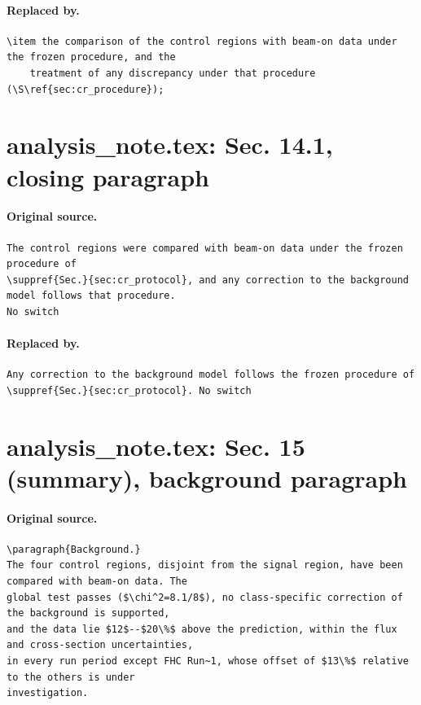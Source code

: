\documentclass[11pt,a4paper]{article}
\newcommand{\suppref}[2]{#1~\ref{S-#2} of the technical supplement}
\begin{document}
\paragraph{Replaced by.}
\begin{lstlisting}[language={[LaTeX]TeX},basicstyle=\ttfamily\footnotesize,columns=fullflexible]
  \item the comparison of the control regions with beam-on data under the frozen procedure, and the
    treatment of any discrepancy under that procedure (\S\ref{sec:cr_procedure});
\end{lstlisting}

\section{analysis\_note.tex: Sec. 14.1, closing paragraph}
\paragraph{Original source.}
\begin{lstlisting}[language={[LaTeX]TeX},basicstyle=\ttfamily\footnotesize,columns=fullflexible]
The control regions were compared with beam-on data under the frozen procedure of
\suppref{Sec.}{sec:cr_protocol}, and any correction to the background model follows that procedure.
No switch
\end{lstlisting}
\paragraph{Replaced by.}
\begin{lstlisting}[language={[LaTeX]TeX},basicstyle=\ttfamily\footnotesize,columns=fullflexible]
Any correction to the background model follows the frozen procedure of
\suppref{Sec.}{sec:cr_protocol}. No switch
\end{lstlisting}

\section{analysis\_note.tex: Sec. 15 (summary), background paragraph}
\paragraph{Original source.}
\begin{lstlisting}[language={[LaTeX]TeX},basicstyle=\ttfamily\footnotesize,columns=fullflexible]
\paragraph{Background.}
The four control regions, disjoint from the signal region, have been compared with beam-on data. The
global test passes ($\chi^2=8.1/8$), no class-specific correction of the background is supported,
and the data lie $12$--$20\%$ above the prediction, within the flux and cross-section uncertainties,
in every run period except FHC Run~1, whose offset of $13\%$ relative to the others is under
investigation.
\end{lstlisting}
\end{document}
